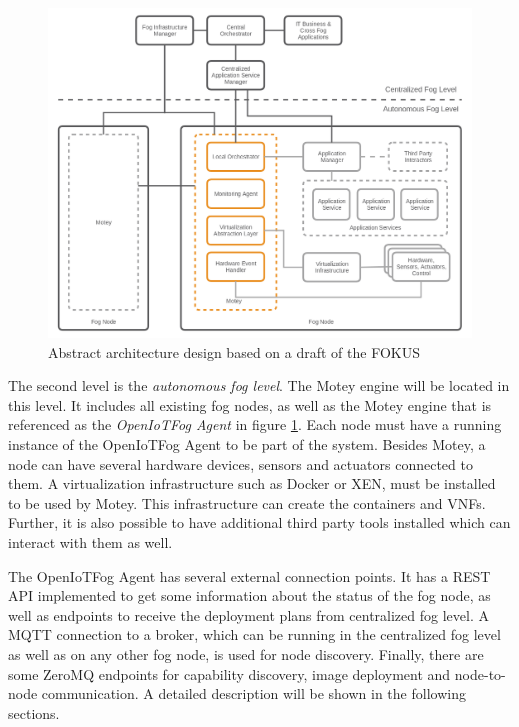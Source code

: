 \begin{figure}[H]
    \centering
    \includegraphics[width=\textwidth]{resources/images/initial_structure.png}
    \caption[Abstract architecture design based on a draft of the FOKUS]{Abstract architecture design based on a draft of the \ac{FOKUS}}
    \label{fig:abstract_architecture_design}
\end{figure}

The second level is the \textit{autonomous fog level}.
The Motey engine will be located in this level.
It includes all existing fog nodes, as well as the Motey engine that is referenced as the \textit{OpenIoTFog Agent} in figure \ref{fig:abstract_architecture_design}.
Each node must have a running instance of the OpenIoTFog Agent to be part of the system.
Besides Motey, a node can have several hardware devices, sensors and actuators connected to them.
A virtualization infrastructure such as Docker or XEN, must be installed to be used by Motey.
This infrastructure can create the containers and \acp{VNF}.
Further, it is also possible to have additional third party tools installed which can interact with them as well.

The OpenIoTFog Agent has several external connection points.
It has a \ac{REST} \ac{API} implemented to get some information about the status of the fog node, as well as endpoints to receive the deployment plans from centralized fog level.
A \ac{MQTT} connection to a broker, which can be running in the centralized fog level as well as on any other fog node, is used for node discovery.
Finally, there are some ZeroMQ endpoints for capability discovery, image deployment and node-to-node communication.
A detailed description will be shown in the following sections.

